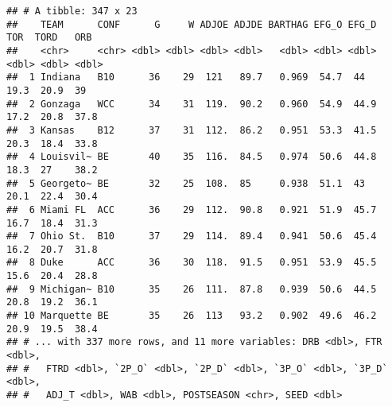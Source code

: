 \documentclass[
]{article}
\newenvironment{Shaded}{\begin{snugshade}}{\end{snugshade}}
\newcommand{\CommentTok}[1]{\textcolor[rgb]{0.56,0.35,0.01}{\textit{#1}}}
\newcommand{\FunctionTok}[1]{\textcolor[rgb]{0.00,0.00,0.00}{#1}}
\newcommand{\NormalTok}[1]{#1}
\newcommand{\SpecialCharTok}[1]{\textcolor[rgb]{0.00,0.00,0.00}{#1}}
\begin{document}
\begin{verbatim}
## # A tibble: 347 x 23
##    TEAM      CONF      G     W ADJOE ADJDE BARTHAG EFG_O EFG_D   TOR  TORD   ORB
##    <chr>     <chr> <dbl> <dbl> <dbl> <dbl>   <dbl> <dbl> <dbl> <dbl> <dbl> <dbl>
##  1 Indiana   B10      36    29  121   89.7   0.969  54.7  44    19.3  20.9  39  
##  2 Gonzaga   WCC      34    31  119.  90.2   0.960  54.9  44.9  17.2  20.8  37.8
##  3 Kansas    B12      37    31  112.  86.2   0.951  53.3  41.5  20.3  18.4  33.8
##  4 Louisvil~ BE       40    35  116.  84.5   0.974  50.6  44.8  18.3  27    38.2
##  5 Georgeto~ BE       32    25  108.  85     0.938  51.1  43    20.1  22.4  30.4
##  6 Miami FL  ACC      36    29  112.  90.8   0.921  51.9  45.7  16.7  18.4  31.3
##  7 Ohio St.  B10      37    29  114.  89.4   0.941  50.6  45.4  16.2  20.7  31.8
##  8 Duke      ACC      36    30  118.  91.5   0.951  53.9  45.5  15.6  20.4  28.8
##  9 Michigan~ B10      35    26  111.  87.8   0.939  50.6  44.5  20.8  19.2  36.1
## 10 Marquette BE       35    26  113   93.2   0.902  49.6  46.2  20.9  19.5  38.4
## # ... with 337 more rows, and 11 more variables: DRB <dbl>, FTR <dbl>,
## #   FTRD <dbl>, `2P_O` <dbl>, `2P_D` <dbl>, `3P_O` <dbl>, `3P_D` <dbl>,
## #   ADJ_T <dbl>, WAB <dbl>, POSTSEASON <chr>, SEED <dbl>
\end{verbatim}

\begin{Shaded}
\end{Shaded}
\end{document}
